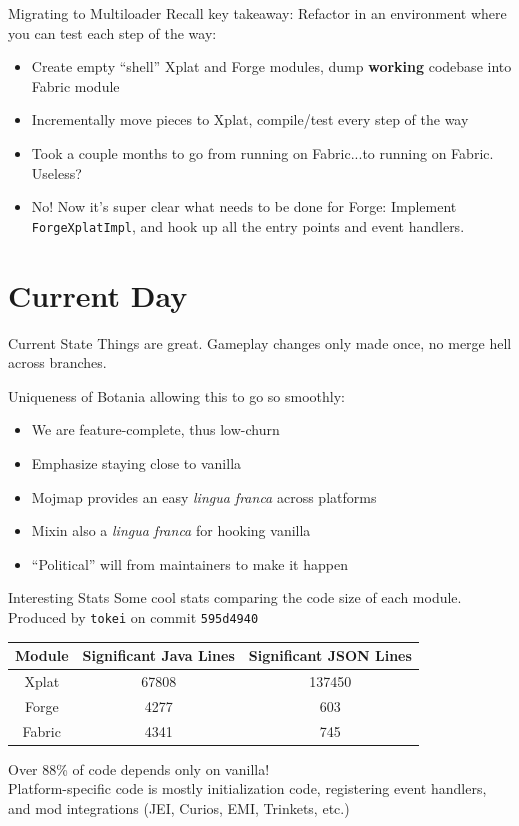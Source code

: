 \documentclass{beamer}
\begin{document}
\begin{frame}{Migrating to Multiloader}
  Recall key takeaway: Refactor in an environment where you can test each step of the way:
  \begin{itemize}
  \item Create empty ``shell'' Xplat and Forge modules, dump \textbf{working} codebase into Fabric module
  \item Incrementally move pieces to Xplat, compile/test every step of the way
  \item Took a couple months to go from running on Fabric...to running on Fabric. Useless?
  \item No! Now it's super clear what needs to be done for Forge: Implement \texttt{ForgeXplatImpl}, and hook up all the entry points and event handlers.
  \end{itemize}
  
\end{frame}

\section{Current Day}
\begin{frame}{Current State}
  Things are great. Gameplay changes only made once, no merge hell across branches.

  Uniqueness of Botania allowing this to go so smoothly:
  \begin{itemize}
  \item We are feature-complete, thus low-churn
  \item Emphasize staying close to vanilla
  \item Mojmap provides an easy \textit{lingua franca} across platforms
  \item Mixin also a \textit{lingua franca} for hooking vanilla
  \item ``Political'' will from maintainers to make it happen
  \end{itemize}
\end{frame}

\begin{frame}{Interesting Stats}
  Some cool stats comparing the code size of each module.
  Produced by \texttt{tokei} on commit \texttt{595d4940}

  
  \begin{tabular}{|c||c|c|}
    \hline
    Module & Significant Java Lines & Significant JSON Lines \\
    \hline\hline
    Xplat  & 67808 & 137450 \\
    \hline
    Forge  & 4277  & 603 \\
    \hline
    Fabric & 4341  & 745 \\
    \hline
  \end{tabular}

  Over 88\% of code depends only on vanilla!\\
  Platform-specific code is mostly initialization code, registering event handlers,
  and mod integrations (JEI, Curios, EMI, Trinkets, etc.)
\end{frame}
\end{document}
